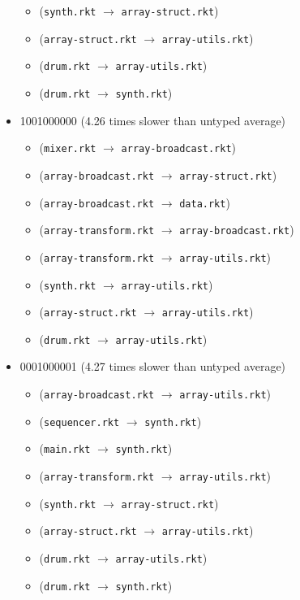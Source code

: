 \documentclass{article}
\newcommand{\mono}[1]{\texttt{#1}}
\begin{document}
\begin{itemize}
\begin{itemize}
  \item (\mono{synth.rkt} $\rightarrow$ \mono{array-struct.rkt})
  \item (\mono{array-struct.rkt} $\rightarrow$ \mono{array-utils.rkt})
  \item (\mono{drum.rkt} $\rightarrow$ \mono{array-utils.rkt})
  \item (\mono{drum.rkt} $\rightarrow$ \mono{synth.rkt})
  \end{itemize}
\item 1001000000 (4.26 times slower than untyped average)
  \begin{itemize}
  \item (\mono{mixer.rkt} $\rightarrow$ \mono{array-broadcast.rkt})
  \item (\mono{array-broadcast.rkt} $\rightarrow$ \mono{array-struct.rkt})
  \item (\mono{array-broadcast.rkt} $\rightarrow$ \mono{data.rkt})
  \item (\mono{array-transform.rkt} $\rightarrow$ \mono{array-broadcast.rkt})
  \item (\mono{array-transform.rkt} $\rightarrow$ \mono{array-utils.rkt})
  \item (\mono{synth.rkt} $\rightarrow$ \mono{array-utils.rkt})
  \item (\mono{array-struct.rkt} $\rightarrow$ \mono{array-utils.rkt})
  \item (\mono{drum.rkt} $\rightarrow$ \mono{array-utils.rkt})
  \end{itemize}
\item 0001000001 (4.27 times slower than untyped average)
  \begin{itemize}
  \item (\mono{array-broadcast.rkt} $\rightarrow$ \mono{array-utils.rkt})
  \item (\mono{sequencer.rkt} $\rightarrow$ \mono{synth.rkt})
  \item (\mono{main.rkt} $\rightarrow$ \mono{synth.rkt})
  \item (\mono{array-transform.rkt} $\rightarrow$ \mono{array-utils.rkt})
  \item (\mono{synth.rkt} $\rightarrow$ \mono{array-struct.rkt})
  \item (\mono{array-struct.rkt} $\rightarrow$ \mono{array-utils.rkt})
  \item (\mono{drum.rkt} $\rightarrow$ \mono{array-utils.rkt})
  \item (\mono{drum.rkt} $\rightarrow$ \mono{synth.rkt})
  \end{itemize}

\end{itemize}
\end{document}
